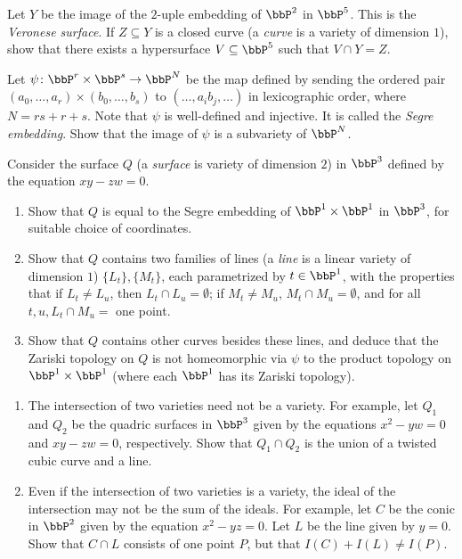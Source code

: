 \begin{exercise}[2.13]
    Let $Y$ be the image of the $2$-uple embedding of $\bbP^2$ in $\bbP^5$. This is the
    \emph{Veronese surface}. If $Z \subseteq Y$ is a closed curve (a \emph{curve} is 
    a variety of dimension $1$), show that there exists a hypersurface $V \subseteq
    \bbP^5$ such that $V \cap Y = Z$. 
\end{exercise}

\begin{exercise}[2.14]
    Let $\psi\colon \bbP^r \times \bbP^s \to \bbP^N$ be the map defined by sending
    the ordered pair $(a_0, \ldots, a_r) \times (b_0, \ldots, b_s)$ to $(\ldots,
    a_ib_j, \ldots)$ in lexicographic order, where $N = rs + r +s$. Note that
    $\psi$ is well-defined and injective. It is called the \emph{Segre embedding}.
    Show that the image of $\psi$ is a subvariety of $\bbP^N$.
\end{exercise}

\begin{exercise}[2.15]
    Consider the surface $Q$ (a \emph{surface} is variety of dimension $2$) in
    $\bbP^3$ defined by the equation $xy-zw = 0$.
    \begin{enumerate} 
      \item Show that $Q$ is equal to the Segre embedding of $\bbP^1 \times \bbP^1$ in
        $\bbP^3$, for suitable choice of coordinates.
      \item Show that $Q$ contains two families of lines (a \emph{line} is a
        linear variety of dimension $1$) $\{L_t\}, \{M_t\}$, each parametrized by
        $t \in \bbP^1$, with the properties that if $L_t \ne L_u$, then
        $L_t \cap L_u = \emptyset$; if $M_t \ne M_u$, $M_t \cap M_u = \emptyset$,
        and for all $t,u, L_t \cap M_u =$ one point. 
      \item Show that $Q$ contains other curves besides these lines, and deduce that
        the Zariski topology on $Q$ is not homeomorphic via $\psi$ to the product
        topology on $\bbP^1 \times \bbP^1$ (where each $\bbP^1$ has its Zariski
        topology). 
    \end{enumerate}
\end{exercise}

\begin{exercise}[2.16]
    \begin{enumerate}
        \item The intersection of two varieties need not be a variety. For example,
        let $Q_1$ and $Q_2$ be the quadric surfaces in $\bbP^3$ given by the
        equations $x^2-yw = 0$ and $xy - zw =0$, respectively. Show that $Q_1 \cap
        Q_2$ is the union of a twisted cubic curve and a line.
        
        \item Even if the intersection of two varieties is a variety, the ideal of the
        intersection may not be the sum of the ideals. For example, let $C$ be the
        conic in $\bbP^2$ given by the equation $x^2-yz = 0$. Let $L$ be the line
        given by $y = 0$. Show that $C \cap L$ consists of one point $P$, but that
        $I(C) + I(L) \ne I(P)$. 
    \end{enumerate}
\end{exercise}

